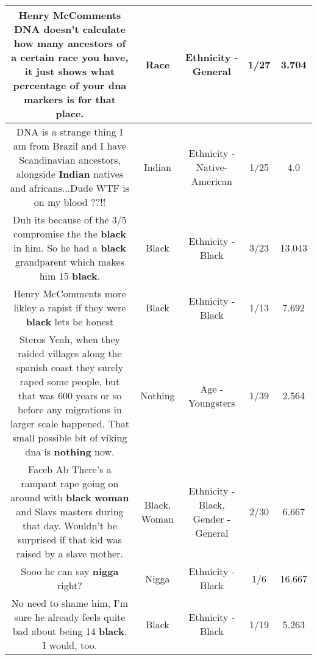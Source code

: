 \documentclass[11pt]{article}
\newlength\mylength
\begin{document}
\begin{center}
\begin{longtable}{|C{.65\mylength}|C{.30\mylength}|C{.12\mylength}|C{.12\mylength}|C{.12\mylength}|}
  \small Henry McComments DNA doesn't calculate how many ancestors of a certain \textbf{race} you have, it just shows what percentage of your dna markers is for that place.\normalsize   & Race & Ethnicity - General & 1/27 & 3.704 \\  \hline
  \small DNA is a strange thing I am from Brazil and I have Scandinavian ancestors, alongside \textbf{Indian} natives and africans...Dude WTF is on my blood ??!!\normalsize   & Indian & Ethnicity - Native-American & 1/25 & 4.0 \\  \hline
  \small Duh its because of the 3/5 compromise the the \textbf{black} in him. So he had a \textbf{black} grandparent which makes him 15 \textbf{black}.\normalsize   & Black & Ethnicity - Black & 3/23 & 13.043 \\  \hline
  \small Henry McComments more likley a rapist if they were \textbf{black} lets be honest\normalsize   & Black & Ethnicity - Black & 1/13 & 7.692 \\  \hline
  \small Steros Yeah, when they raided villages along the spanish coast they surely raped some people, but that was 600 years or so before any migrations in larger scale happened. That small possible bit of viking dna is \textbf{nothing} now.\normalsize   & Nothing & Age - Youngsters & 1/39 & 2.564 \\  \hline
  \small Faceb Ab There's a rampant rape going on around with \textbf{black} \textbf{woman} and Slavs masters during that day. Wouldn't be surprised if that kid was raised by a slave mother.\normalsize   & Black, Woman & Ethnicity - Black, Gender - General & 2/30 & 6.667 \\  \hline
  \small Sooo he can say \textbf{nigga} right?\normalsize   & Nigga & Ethnicity - Black & 1/6 & 16.667 \\  \hline
  \small No need to shame him, I'm sure he already feels quite bad about being 14 \textbf{black}. I would, too.\normalsize   & Black & Ethnicity - Black & 1/19 & 5.263 \\  \hline

\end{longtable}
\end{center}
\end{document}
